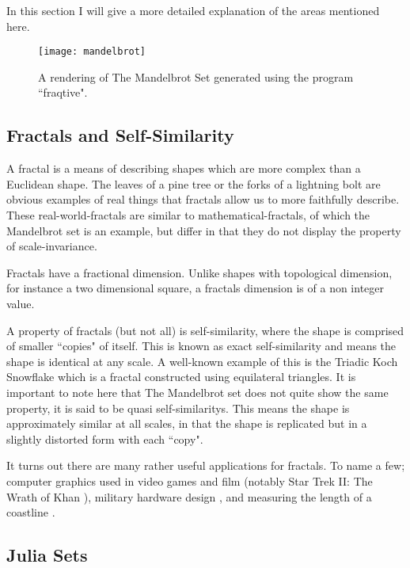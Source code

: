 In this section I will give a more detailed explanation of the areas mentioned here. 

\begin{figure}[h]
  \caption{A rendering of The Mandelbrot Set generated using the program ``fraqtive"\cite{fraqtive}.}
  \label{fig:mandelimg}
  \centering
    \texttt{[image: mandelbrot]}
\end{figure}

\subsection*{Fractals and Self-Similarity} 
A \gls{fractal} is a means of describing shapes which are more complex than a Euclidean shape. The leaves of a pine tree or the forks of a 
lightning bolt are obvious examples of real things that fractals allow us to more faithfully describe. 
These \glspl{real-world-fractal} are similar to \glspl{mathematical-fractal}, 
of which the Mandelbrot set is an example, but differ in that they do not display the property of \gls{scale-invariance}. 

Fractals have a fractional dimension. Unlike shapes with topological dimension, for instance a two dimensional square, 
a \glspl{fractal} dimension is of a non integer value.

A property of fractals (but not all) is \gls{self-similarity}, where the shape is comprised of smaller ``copies" of itself. 
This is known as \gls{exact self-similarity} and means the shape is identical at any scale.
A well-known example of this is the Triadic Koch Snowflake which is a fractal constructed using equilateral triangles. 
It is important to note here that The Mandelbrot set does not quite show the same property, it is said to be 
\glspl{quasi self-similarity}. This means the shape is approximately similar at all scales, in that the shape is replicated but in a slightly distorted
form with each ``copy".

It turns out there are many rather useful applications for fractals. To name a few; 
computer graphics used in video games and film (notably Star Trek II: The Wrath of Khan \cite[p.~8]{fractimg}), 
military hardware design \cite{fractantenna}, and measuring the length of a coastline \cite{coastline}.

\subsection*{Julia Sets}

